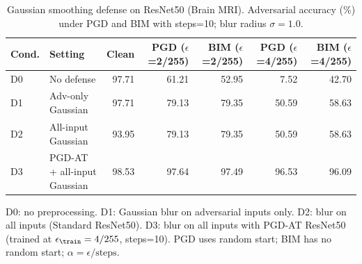 \begin{table}[htbp]
  \centering
  \caption{Gaussian smoothing defense on ResNet50 (Brain MRI). Adversarial accuracy (\%) under PGD and BIM with steps=10; blur radius $\sigma=1.0$.}
  \label{tab:gaussian_defense_resnet50}
  \begin{tabular}{llrrrrr}
    \toprule
    Cond. & Setting & Clean & PGD ($\epsilon$=2/255) & BIM ($\epsilon$=2/255) & PGD ($\epsilon$=4/255) & BIM ($\epsilon$=4/255) \\
    \midrule
    D0 & No defense & 97.71 & 61.21 & 52.95 &  7.52 & 42.70 \\
    D1 & Adv-only Gaussian & 97.71 & 79.13 & 79.35 & 50.59 & 58.63 \\
    D2 & All-input Gaussian & 93.95 & 79.13 & 79.35 & 50.59 & 58.63 \\
    D3 & PGD-AT + all-input Gaussian & 98.53 & 97.64 & 97.49 & 96.53 & 96.09 \\
    \bottomrule
  \end{tabular}
  \vspace{0.25em}
  \begin{minipage}{0.92\linewidth}
    \footnotesize
    D0: no preprocessing. D1: Gaussian blur on adversarial inputs only.
    D2: blur on all inputs (Standard ResNet50).
    D3: blur on all inputs with PGD-AT ResNet50 (trained at $\epsilon_{\train}=4/255$, steps=10).
    PGD uses random start; BIM has no random start; $\alpha=\epsilon/\text{steps}$.
  \end{minipage}
\end{table}
